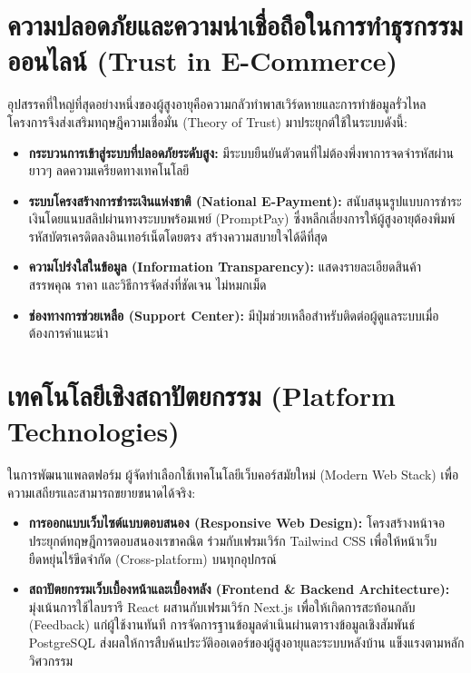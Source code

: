 \section{ความปลอดภัยและความน่าเชื่อถือในการทำธุรกรรมออนไลน์ (Trust in E-Commerce)}
อุปสรรคที่ใหญ่ที่สุดอย่างหนึ่งของผู้สูงอายุคือความกลัวทำพาสเวิร์ดหายและการทำข้อมูลรั่วไหล โครงการจึงส่งเสริมทฤษฎีความเชื่อมั่น (Theory of Trust) \cite{shneiderman2010} มาประยุกต์ใช้ในระบบดังนี้:
\begin{itemize}
    \item \textbf{กระบวนการเข้าสู่ระบบที่ปลอดภัยระดับสูง:} มีระบบยืนยันตัวตนที่ไม่ต้องพึ่งพาการจดจำรหัสผ่านยาวๆ ลดความเครียดทางเทคโนโลยี
    \item \textbf{ระบบโครงสร้างการชำระเงินแห่งชาติ (National E-Payment):} สนับสนุนรูปแบบการชำระเงินโดยแนบสลิปผ่านทางระบบพร้อมเพย์ (PromptPay) \cite{promptpay2021} ซึ่งหลีกเลี่ยงการให้ผู้สูงอายุต้องพิมพ์รหัสบัตรเครดิตลงอินเทอร์เน็ตโดยตรง สร้างความสบายใจได้ดีที่สุด
    \item \textbf{ความโปร่งใสในข้อมูล (Information Transparency):} แสดงรายละเอียดสินค้า สรรพคุณ ราคา และวิธีการจัดส่งที่ชัดเจน ไม่หมกเม็ด
    \item \textbf{ช่องทางการช่วยเหลือ (Support Center):} มีปุ่มช่วยเหลือสำหรับติดต่อผู้ดูแลระบบเมื่อต้องการคำแนะนำ
\end{itemize}

\section{เทคโนโลยีเชิงสถาปัตยกรรม (Platform Technologies)}
ในการพัฒนาแพลตฟอร์ม ผู้จัดทำเลือกใช้เทคโนโลยีเว็บคอร์สมัยใหม่ (Modern Web Stack) เพื่อความเสถียรและสามารถขยายขนาดได้จริง:
\begin{itemize}
    \item \textbf{การออกแบบเว็บไซต์แบบตอบสนอง (Responsive Web Design):} โครงสร้างหน้าจอประยุกต์ทฤษฎีการตอบสนองเรขาคณิต \cite{responsiveweb} ร่วมกับเฟรมเวิร์ก Tailwind CSS \cite{tailwind2023} เพื่อให้หน้าเว็บยืดหยุ่นไร้ขีดจำกัด (Cross-platform) บนทุกอุปกรณ์
    \item \textbf{สถาปัตยกรรมเว็บเบื้องหน้าและเบื้องหลัง (Frontend \& Backend Architecture):} มุ่งเน้นการใช้ไลบรารี React \cite{react2023} ผสานกับเฟรมเวิร์ก Next.js \cite{nextjs2023} เพื่อให้เกิดการสะท้อนกลับ (Feedback) แก่ผู้ใช้งานทันที การจัดการฐานข้อมูลดำเนินผ่านตารางข้อมูลเชิงสัมพันธ์ PostgreSQL \cite{postgresql2023} ส่งผลให้การสืบค้นประวัติออเดอร์ของผู้สูงอายุและระบบหลังบ้าน แข็งแรงตามหลักวิศวกรรม \cite{fielding2000}
\end{itemize}
